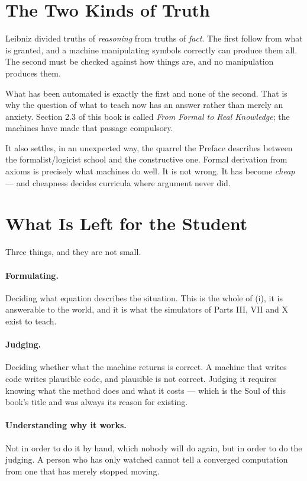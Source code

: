 \section{The Two Kinds of Truth}

Leibniz divided truths of \emph{reasoning} from truths of \emph{fact}. The first follow from what
is granted, and a machine manipulating symbols correctly can produce them all. The second must be
checked against how things are, and no manipulation produces them.

What has been automated is exactly the first and none of the second. That is why the question of
what to teach now has an answer rather than merely an anxiety. Section 2.3 of this book is called
\emph{From Formal to Real Knowledge}; the machines have made that passage compulsory.

It also settles, in an unexpected way, the quarrel the Preface describes between the
formalist/logicist school and the constructive one. Formal derivation from axioms is precisely what
machines do well. It is not wrong. It has become \emph{cheap} --- and cheapness decides curricula
where argument never did.

\section{What Is Left for the Student}

Three things, and they are not small.

\paragraph{Formulating.} Deciding what equation describes the situation. This is the whole of (i),
it is answerable to the world, and it is what the simulators of Parts III, VII and X exist to teach.

\paragraph{Judging.} Deciding whether what the machine returns is correct. A machine that writes
code writes plausible code, and plausible is not correct. Judging it requires knowing what the
method does and what it costs --- which is the Soul of this book's title and was always its reason
for existing.

\paragraph{Understanding why it works.} Not in order to do it by hand, which nobody will do again,
but in order to do the judging. A person who has only watched cannot tell a converged computation
from one that has merely stopped moving.

